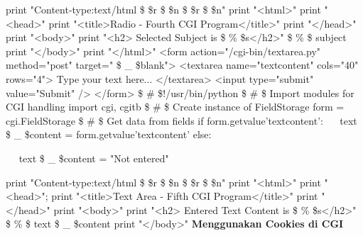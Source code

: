 \begin{12pt}
\begin{12pt}
\begin{12pt}
\begin{12pt}
\begin{12pt}
print "Content-type:text/html \$  \setminus  \$r \$  \setminus  \$n \$  \setminus  \$r \$  \setminus  \$n" 
print "<html>" 
print "<head>" 
print "<title>Radio - Fourth CGI Program</title>" 
print "</head>"
print "<body>" 
print "<h2> Selected Subject is  \$  \%  \$s</h2>"  \$  \%  \$ subject 
print "</body>" 
print "</html>" 
<form action="/cgi-bin/textarea.py" method="post" target=" \$  \_  \$blank"> 
<textarea name="textcontent" cols="40" rows="4"> 
Type your text here... 
</textarea> 
<input type="submit" value="Submit" /> 
</form>  
 \$  \#  \$!/usr/bin/python 
 \$  \#  \$ Import modules for CGI handling  
import cgi, cgitb  
  \$  \#  \$ Create instance of FieldStorage  
form = cgi.FieldStorage{}
 \$  \#  \$ Get data from fields 
if form.getvalue{'textcontent'}: 
~~ text \$  \_  \$content = form.getvalue{'textcontent'} 
else: 

~~ text \$  \_  \$content = "Not entered" 

print "Content-type:text/html \$  \setminus  \$r \$  \setminus  \$n \$  \setminus  \$r \$  \setminus  \$n" 
\noindent 
print "<html>" 
print "<head>"; 
print "<title>Text Area - Fifth CGI Program</title>" 
print "</head>" 
print "<body>" 
print "<h2> Entered Text Content is  \$  \%  \$s</h2>"  \$  \%  \$ text \$  \_  \$content 
print "</body>" 
{\fontsize{14pt}{14pt}\selectfont \textbf{Menggunakan Cookies di CGI} \\} 


\end{12pt}
\end{12pt}
\end{12pt}
\end{12pt}
\end{12pt}
